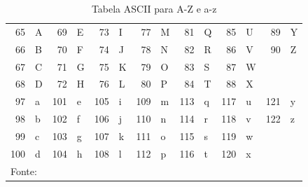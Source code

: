 \documentclass[12pt,a4paper]{article}
\numberwithin{figure}{subsection}
\numberwithin{table}{subsection}
\begin{document}
\begin{table}[H]
	\renewcommand{\arraystretch}{1.2}
	\centering
	\caption{Tabela ASCII para A-Z e a-z}
	\label{tab:ascii}
	\begin{tabular}{rl|rl|rl|rl|rl|rl|rl}
		\toprule
		 65 & A &  69 & E &  73 & I &  77 & M &  81 & Q &  85 & U &  89 & Y \\
		 66 & B &  70 & F &  74 & J &  78 & N &  82 & R &  86 & V &  90 & Z \\
		 67 & C &  71 & G &  75 & K &  79 & O &  83 & S &  87 & W &     &   \\
		 68 & D &  72 & H &  76 & L &  80 & P &  84 & T &  88 & X &     &   \\
		\midrule
		 97 & a & 101 & e & 105 & i & 109 & m & 113 & q & 117 & u & 121 & y \\
		 98 & b & 102 & f & 106 & j & 110 & n & 114 & r & 118 & v & 122 & z \\
		 99 & c & 103 & g & 107 & k & 111 & o & 115 & s & 119 & w &     &   \\
		100 & d & 104 & h & 108 & l & 112 & p & 116 & t & 120 & x &     &   \\
		\bottomrule
		\multicolumn{12}{l}{\footnotesize Fonte: \citeauthor{wiki:xxx}}
	\end{tabular}
\end{table}
\end{document}
